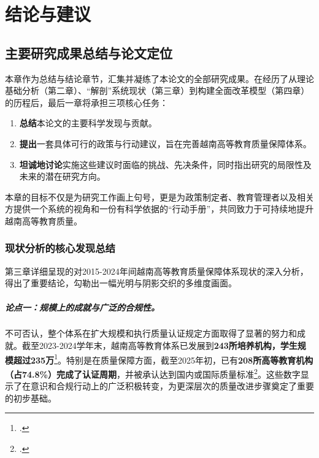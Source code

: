 
\chapter{结论与建议}
\label{chap:ket_luan_khuyen_nghi}


\section{主要研究成果总结与论文定位}
\label{sec:tong_hop_ket_qua}

本章作为总结与结论章节，汇集并凝练了本论文的全部研究成果。在经历了从理论基础分析（第二章）、“解剖”系统现状（第三章）到构建全面改革模型（第四章）的历程后，最后一章将承担三项核心任务：
\begin{enumerate}
    \item \textbf{总结}本论文的主要科学发现与贡献。
    \item \textbf{提出}一套具体可行的政策与行动建议，旨在完善越南高等教育质量保障体系。
    \item \textbf{坦诚地讨论}实施这些建议时面临的挑战、先决条件，同时指出研究的局限性及未来的潜在研究方向。
\end{enumerate}

本章的目标不仅是为研究工作画上句号，更是为政策制定者、教育管理者以及相关方提供一个系统的视角和一份有科学依据的“行动手册”，共同致力于可持续地提升越南高等教育质量。

\subsection{现状分析的核心发现总结}
\label{subsec:tom_tat_phat_hien}

第三章详细呈现的对2015-2024年间越南高等教育质量保障体系现状的深入分析，得出了重要结论，勾勒出一幅光明与阴影交织的多维度画面。

\paragraph{论点一：规模上的成就与广泛的合规性。}
不可否认，整个体系在扩大规模和执行质量认证规定方面取得了显著的努力和成就。截至2023-2024学年末，越南高等教育体系已发展到\textbf{243所培养机构，学生规模超过235万}\footcite{thanhnien_quymo_2024}。特别是在质量保障方面，截至2025年初，已有\textbf{208所高等教育机构（占74.8\%）完成了认证周期}，并被承认达到国内或国际质量标准\footcite{dantri_kiemdinh_2025}。这些数字显示了在意识和合规行动上的广泛积极转变，为更深层次的质量改进步骤奠定了重要的初步基础。

